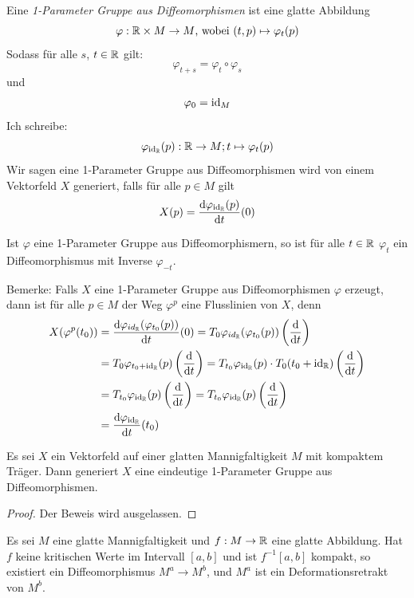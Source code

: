 \begin{definition}
    Eine \textit{1-Parameter Gruppe aus Diffeomorphismen} ist eine glatte 
    Abbildung
    \[ \varphi: \R \times M \to M \text{, wobei } (t, p) \mapsto \varphi_t(p) \]
    Sodass für alle $s$, $t \in \R$ gilt:
    \[ \varphi_{t + s} = \varphi_t \circ \varphi_s \]
    und 
    \[ \varphi_0 = \id_M \]
    Ich schreibe:
    \[ \varphi_{\id_{\R}}(p): \R \to M ; t \mapsto \varphi_t(p) \]
    Wir sagen eine 1-Parameter Gruppe aus Diffeomorphismen wird von einem
    Vektorfeld $X$ generiert, falls für alle $p \in M$ gilt
    \[ X(p) = \derive[\varphi_{\id_{\R}}(p)]{t}(0) \]
\end{definition}

Ist $\varphi$ eine 1-Parameter Gruppe aus Diffeomorphismern, so ist für alle 
$t \in \R$ $\varphi_t$ ein Diffeomorphismus mit Inverse $\varphi_{-t}$.

Bemerke: Falls $X$ eine 1-Parameter Gruppe aus Diffeomorphismen $\varphi$ erzeugt,
dann ist für alle $p \in M$ der Weg $\varphi^p$ eine Flusslinien von $X$, denn
\begin{align*}
    X(\varphi^p(t_0)) 
    & = \derive[\varphi_{id_{\R}}(\varphi_{t_0}(p))]{t}(0)
    = T_0 \varphi_{id_{\R}}(\varphi_{t_0}(p)) \left(\derive{t}\right) \\
    & = T_0 \varphi_{t_0 + \id_{\R}}(p) \left(\derive{t}\right)
    = T_{t_0} \varphi_{\id_{\R}}(p) \cdot T_0 (t_0 + \id_{\R}) \left(\derive{t}\right) \\
    & = T_{t_0} \varphi_{\id_{\R}}(p) \left(\derive{t}\right)
    = T_{t_0} \varphi_{\id_{\R}}(p) \left(\derive{t}\right) \\
    & = \derive[\varphi_{\id_{\R}}]{t}(t_0)
\end{align*}

\begin{lemma}
    \label{lemma:generierende vektorfelder}
    Es sei $X$ ein Vektorfeld auf einer glatten Mannigfaltigkeit $M$ mit kompaktem 
    Träger. Dann generiert $X$ eine eindeutige 1-Parameter Gruppe aus 
    Diffeomorphismen.
\end{lemma}

\begin{proof} Der Beweis wird ausgelassen. \end{proof}

\begin{theorem}
    \label{theorem:erstes deformationslemma}
    Es sei $M$ eine glatte Mannigfaltigkeit und $f: M \rightarrow \R$ eine
    glatte Abbildung. Hat $f$ keine kritischen Werte im Intervall $[a, b]$ und 
    ist $f^{-1}[a, b]$ kompakt, so existiert ein Diffeomorphismus 
    $M^a \rightarrow M^b$, und $M^a$ ist ein Deformationsretrakt von $M^b$.
\end{theorem}

